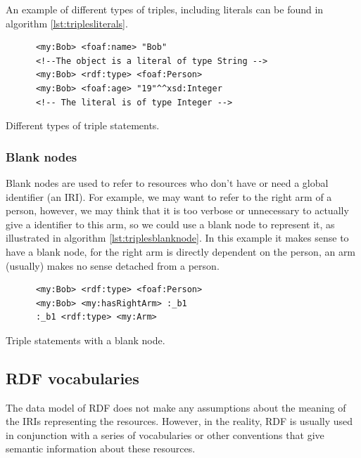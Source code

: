 An example of different types of triples, including literals can be found in algorithm \ref{lst:triplesliterals}.

\begin{listing}\centering
  \begin{minipage}{.6\textwidth}
    \begin{verbatim}
      <my:Bob> <foaf:name> "Bob"
      <!--The object is a literal of type String -->
      <my:Bob> <rdf:type> <foaf:Person> 
      <my:Bob> <foaf:age> "19"^^xsd:Integer 
      <!-- The literal is of type Integer -->
    \end{verbatim}
  \end{minipage}
  \caption{Different types of triple statements.}\label{lst:triplesliterals}
\end{listing}

\subsubsection*{Blank nodes}

Blank nodes are used to refer to resources who don't have or need a global identifier (an IRI). For example, we may want to refer to the right arm of a person, however, we may think that it is too verbose or unnecessary to actually give a identifier to this arm, so we could use a blank node to represent it, as illustrated in algorithm \ref{lst:triplesblanknode}. In this example it makes sense to have a blank node, for the right arm is directly dependent on the person, an arm (usually) makes no sense detached from a person.

\begin{listing}\centering
  \begin{minipage}{.6\textwidth}
    \begin{verbatim}
      <my:Bob> <rdf:type> <foaf:Person> 
      <my:Bob> <my:hasRightArm> :_b1
      :_b1 <rdf:type> <my:Arm>
    \end{verbatim}
  \end{minipage}
  \caption{Triple statements with a blank node.}\label{lst:triplesblanknode}
\end{listing}

\subsection*{RDF vocabularies}\label{ssec:rdfvocabularies}

The data model of RDF does not make any assumptions about the meaning of the IRIs representing the resources. However, in the reality, RDF is usually used in conjunction with a series of vocabularies or other conventions that give semantic information about these resources.

